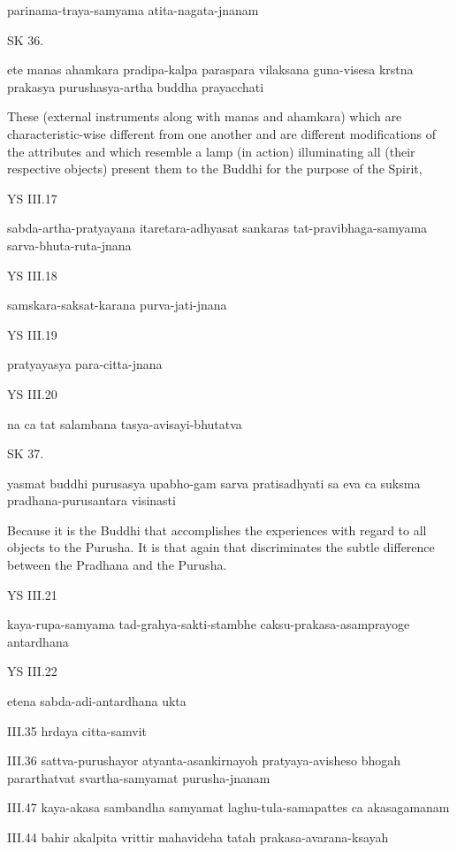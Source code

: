 parinama-traya-samyama atita-nagata-jnanam

SK 36.

ete manas ahamkara pradipa-kalpa paraspara vilaksana
guna-visesa krstna prakasya purushasya-artha buddha prayacchati

These (external instruments along with manas and ahamkara)
which are characteristic-wise different from one another
and are different modifications of the attributes
and which resemble a lamp (in action)
illuminating all (their respective objects)
present them to the Buddhi for the purpose of the Spirit,

YS III.17

sabda-artha-pratyayana itaretara-adhyasat sankaras
tat-pravibhaga-samyama sarva-bhuta-ruta-jnana

YS III.18

samskara-saksat-karana purva-jati-jnana

YS III.19

pratyayasya para-citta-jnana

YS III.20

na ca tat salambana tasya-avisayi-bhutatva

SK 37.

yasmat buddhi purusasya upabho-gam sarva pratisadhyati
sa eva ca suksma pradhana-purusantara visinasti

Because it is the Buddhi that accomplishes the experiences
with regard to all objects to the Purusha.
It is that again that discriminates the subtle difference
between the Pradhana and the Purusha.

YS III.21

kaya-rupa-samyama tad-grahya-sakti-stambhe
caksu-prakasa-asamprayoge antardhana

YS III.22

etena sabda-adi-antardhana ukta


III.35
hrdaya citta-samvit

III.36
sattva-purushayor atyanta-asankirnayoh pratyaya-avisheso bhogah pararthatvat svartha-samyamat purusha-jnanam


III.47
kaya-akasa sambandha samyamat laghu-tula-samapattes ca akasagamanam


III.44
bahir akalpita vrittir mahavideha tatah prakasa-avarana-ksayah
